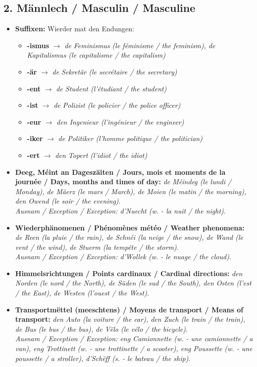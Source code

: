 \subsection*{2. Männlech / Masculin / Masculine}
\begin{itemize}
    \item \textbf{Suffixen:} Wierder mat den Endungen:
        \begin{itemize}
            \item \textbf{-ismus} $\rightarrow$ \textit{de Feminismus (le féminisme / the feminism), de Kapitalismus (le capitalisme / the capitalism)}
            \item \textbf{-är} $\rightarrow$ \textit{de Sekretär (le secrétaire / the secretary)}
            \item \textbf{-ent} $\rightarrow$ \textit{de Student (l'étudiant / the student)}
            \item \textbf{-ist} $\rightarrow$ \textit{de Polizist (le policier / the police officer)}
            \item \textbf{-eur} $\rightarrow$ \textit{den Ingenieur (l'ingénieur / the engineer)}
            \item \textbf{-iker} $\rightarrow$ \textit{de Politiker (l'homme politique / the politician)}
            \item \textbf{-ert} $\rightarrow$ \textit{den Topert (l'idiot / the idiot)}
        \end{itemize}
    \item \textbf{Deeg, Méint an Dageszäiten / Jours, mois et moments de la journée / Days, months and times of day:} \textit{de Méindeg (le lundi / Monday), de Mäerz (le mars / March), de Moien (le matin / the morning), den Owend (le soir / the evening)}. \\ \textit{Ausnam / Exception / Exception: d'Nuecht (w. - la nuit / the night)}.
    \item \textbf{Wiederphänomenen / Phénomènes météo / Weather phenomena:} \textit{de Reen (la pluie / the rain), de Schnéi (la neige / the snow), de Wand (le vent / the wind), de Stuerm (la tempête / the storm)}. \\ \textit{Ausnam / Exception / Exception: d'Wollek (w. - le nuage / the cloud)}.
    \item \textbf{Himmelsrichtungen / Points cardinaux / Cardinal directions:} \textit{den Norden (le nord / the North), de Süden (le sud / the South), den Osten (l'est / the East), de Westen (l'ouest / the West)}.
    \item \textbf{Transportmëttel (meeschtens) / Moyens de transport / Means of transport:} \textit{den Auto (la voiture / the car), den Zuch (le train / the train), de Bus (le bus / the bus), de Vëlo (le vélo / the bicycle)}. \\ \textit{Ausnam / Exception / Exception: eng Camionnette (w. - une camionnette / a van), eng Trottinett (w. - une trottinette / a scooter), eng Poussette (w. - une poussette / a stroller), d'Schëff (s. - le bateau / the ship)}.

\end{itemize}
